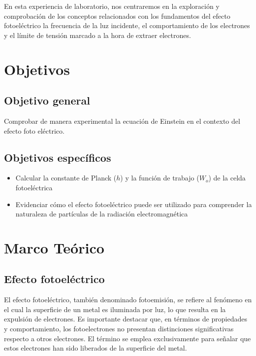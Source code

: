 \documentclass[letterpaper, 12pt]{article}
\begin{document}
En esta experiencia de laboratorio, nos centraremos en la
exploración y comprobación de los conceptos relacionados
con los fundamentos del efecto fotoeléctrico la frecuencia
de la luz incidente, el comportamiento de los electrones y
el límite de tensión marcado a la hora de extraer
electrones.

\section{Objetivos}

\subsection{Objetivo general}

Comprobar de manera experimental la ecuación de Einstein en
el contexto del efecto foto eléctrico.

\subsection{Objetivos específicos}

\begin{itemize}
      \item Calcular la constante de Planck ($h$) y la función de
            trabajo ($W_o$) de la celda fotoeléctrica
      \item Evidenciar cómo el efecto fotoeléctrico puede ser utilizado
            para comprender la naturaleza de partículas de la radiación
            electromagnética
\end{itemize}

\section{Marco Teórico}

\subsection{Efecto fotoeléctrico~\cite{efecto_fotoelectrico_1}~\cite{efecto_fotoelectrico_2}}

El efecto fotoeléctrico, también denominado fotoemisión, se
refiere al fenómeno en el cual la superficie de un metal es
iluminada por luz, lo que resulta en la expulsión de
electrones. Es importante destacar que, en términos de
propiedades y comportamiento, los fotoelectrones no
presentan distinciones significativas respecto a otros
electrones. El término se emplea exclusivamente para
señalar que estos electrones han sido liberados de la
superficie del metal.
\end{document}
